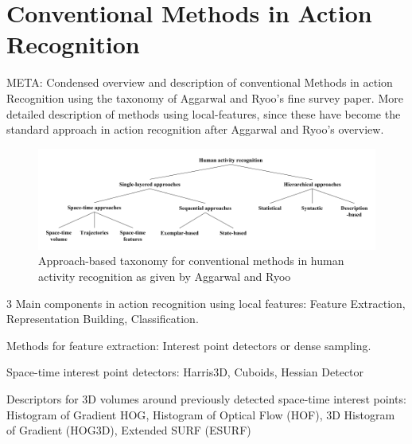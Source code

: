 \section{Conventional Methods in Action Recognition}
META: 
Condensed overview and description of conventional Methods in action Recognition using the taxonomy of Aggarwal and Ryoo's fine survey paper.
More detailed description of methods using local-features, since these have become the standard approach in action recognition after Aggarwal and Ryoo's overview.

\begin{figure}[H]
    \centering
    \includegraphics[width=\textwidth]{img_conventional/taxonomy_conventional_methods.png}
    \caption{Approach-based taxonomy for conventional methods in human activity recognition as given by Aggarwal and Ryoo\cite{aggarwal_human_2011}}
    \label{fig:conventional_taxonomy}
\end{figure}

3 Main components in action recognition using local features: Feature Extraction, Representation Building, Classification.

Methods for feature extraction: Interest point detectors or dense sampling.

Space-time interest point detectors: Harris3D\cite{laptev_space-time_2005}, Cuboids\cite{dollar_behavior_2005}, Hessian Detector\cite{willems_efficient_2008}

Descriptors for 3D volumes around previously detected space-time interest points: Histogram of Gradient HOG\cite{dalal_histograms_2005-1}, Histogram of Optical Flow (HOF)\cite{laptev_learning_2008}, 3D Histogram of Gradient (HOG3D)\cite{klaser_spatio-temporal_2008}, Extended SURF (ESURF)\cite{willems_efficient_2008}
